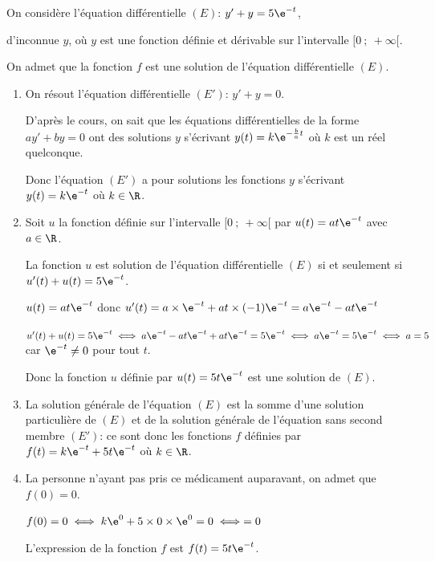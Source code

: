 \medskip

On considère l'équation différentielle  $(E)$: $y' +y = 5\e^{-t}$,

d'inconnue $y$, où $y$ est une fonction définie et dérivable sur l'intervalle $[0~;~+ \infty[$.

On admet que la fonction $f$ est une solution de l'équation différentielle $(E)$.


\begin{enumerate}
\item On résout l'équation différentielle $(E')$: $y' + y = 0$.

D'après le cours, on sait que les équations différentielles de la forme $ay'+by=0$ ont des solutions $y$ s'écrivant $y(t) = k\e^{-\frac{b}{a}t}$ où $k$ est un réel quelconque.

Donc l'équation $(E')$ a pour solutions les fonctions $y$ s'écrivant $y(t)=k\e^{-t}$ où $k\in\R$.

\item Soit $u$ la fonction définie sur l'intervalle $[0~;~ +\infty[$ par $u(t) = at\e^{-t}$ avec $a \in \R$.


La fonction $u$ est solution de l'équation différentielle $(E)$ si et seulement si $u'(t)+u(t)=5\e^{-t}$.

$u(t)=at\e^{-t}$ donc $u'(t)= a\times \e^{-t} + at\times (-1)\e^{-t}= a\e^{-t}-at\e^{-t}$

$u'(t)+u(t)=5\e^{-t}
\iff a\e^{-t}-at\e^{-t} + at\e^{-t}=5\e^{-t}
\iff a\e^{-t}=5\e^{-t}
\iff a=5$ car $\e^{-t}\neq 0$ pour tout $t$.

Donc la fonction $u$ définie par $u(t)=5t\e^{-t}$ est une solution de $(E)$.

\item%
La solution générale de l'équation $(E)$ est la somme d'une solution particulière de $(E)$ et de la solution générale de l'équation sans second membre $(E')$: ce sont donc les fonctions $f$ définies par $f(t)=k\e^{-t}+5t\e^{-t}$ où $k\in\R$.

\item La personne n'ayant pas pris ce médicament auparavant, on admet que $f(0) = 0$.


$f(0)=0 \iff k\e^{0}+5\times 0 \times \e^{0}=0 \iff = 0$

L'expression de la fonction $f$ est $f(t)=5t\e^{-t}$.

\end{enumerate}

